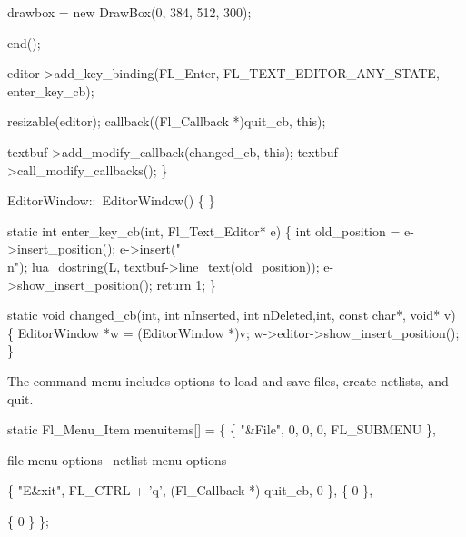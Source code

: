      drawbox = new DrawBox(0, 384, 512, 300);

    end();

    editor->add_key_binding(FL_Enter, FL_TEXT_EDITOR_ANY_STATE,
                               enter_key_cb);

    resizable(editor);
    callback((Fl_Callback *)quit_cb, this);

    textbuf->add_modify_callback(changed_cb, this);
    textbuf->call_modify_callbacks();
\}

EditorWindow::~EditorWindow() 
\{
\}

\nwendcode{}\nwdocspar

\nwenddocs{}\endmoddef
static int enter_key_cb(int, Fl_Text_Editor* e)
\{
    int old_position = e->insert_position();
    e->insert("\\n");
    lua_dostring(L, textbuf->line_text(old_position));
    e->show_insert_position();
    return 1;
\}

static void changed_cb(int, int nInserted, int nDeleted,int, 
                       const char*, void* v) 
\{
    EditorWindow *w = (EditorWindow *)v;
    w->editor->show_insert_position();
\}

\nwendcode{}\nwdocspar

The command menu includes options to load and save files,
create netlists, and quit.

\nwenddocs{}\endmoddef
static Fl_Menu_Item menuitems[] = \{
  \{ "&File",              0, 0, 0, FL_SUBMENU \},

    \LA{}file menu options~{\nwtagstyle{}}\RA{}
    \LA{}netlist menu options~{\nwtagstyle{}}\RA{}

    \{ "E&xit", FL_CTRL + 'q', (Fl_Callback *) quit_cb, 0 \},
    \{ 0 \},

  \{ 0 \}
\};

